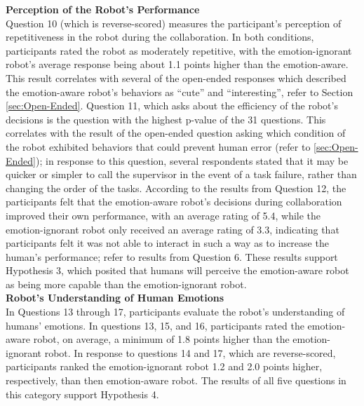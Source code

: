 \documentclass[12pt]{report}
\begin{document}
\hspace*{-8mm} \textbf{Perception of the Robot's Performance} 
\label{sec:Performance}
\\Question 10 (which is reverse-scored) measures the participant's perception of
repetitiveness in the robot during the collaboration. In both conditions,
participants rated the robot as moderately repetitive, with the emotion-ignorant
robot's average response being about 1.1 points higher than the emotion-aware.
This result correlates with several of the open-ended responses which described
the emotion-aware robot's behaviors as ``cute'' and ``interesting'', refer to
Section \ref{sec:Open-Ended}. Question 11, which asks about the efficiency of
the robot's decisions is the question with the highest p-value of the 31
questions. This correlates with the result of the open-ended question asking
which condition of the robot exhibited behaviors that could prevent human error
(refer to \ref{sec:Open-Ended}); in response to this question, several
respondents stated that it may be quicker or simpler to call the supervisor in
the event of a task failure, rather than changing the order of the tasks.
According to the results from Question 12, the participants felt that the
emotion-aware robot's decisions during collaboration improved their own
performance, with an average rating of 5.4, while the emotion-ignorant robot
only received an average rating of 3.3, indicating that participants felt it was
not able to interact in such a way as to increase the human's performance; refer
to results from Question 6. These results support Hypothesis 3, which posited
that humans will perceive the emotion-aware robot as being more capable than the
emotion-ignorant robot. \\

\hspace*{-8mm} \textbf{Robot's Understanding of Human Emotions} 
\label{sec:Emotions}
\\In Questions 13 through 17, participants evaluate the robot's understanding of
humans' emotions. In questions 13, 15, and 16, participants rated the
emotion-aware robot, on average, a minimum of 1.8 points higher than the
emotion-ignorant robot. In response to questions 14 and 17, which are
reverse-scored, participants ranked the emotion-ignorant robot 1.2 and 2.0
points higher, respectively, than then emotion-aware robot. The results
of all five questions in this category support Hypothesis 4. \\
\end{document}
